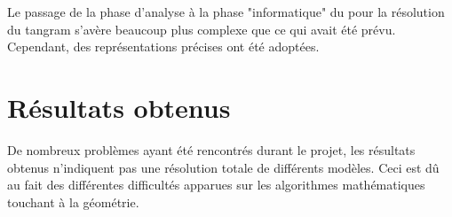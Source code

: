 \documentclass[a4paper, 11pt]{report}
\begin{document}
	Le passage de la phase d'analyse à la phase "informatique" du pour la résolution du tangram s'avère beaucoup plus complexe que ce qui avait été prévu. Cependant, des représentations précises ont été adoptées.
	
	\chapter{Résultats obtenus}
	
	De nombreux problèmes ayant été rencontrés durant le projet, les résultats obtenus n'indiquent pas une résolution totale de différents modèles. Ceci est d\^u au fait des différentes difficultés apparues sur les algorithmes mathématiques touchant à la géométrie.
	
	
	
	
	
	


		
	\newpage	
		
	\tableofcontents
		
\end{document}
